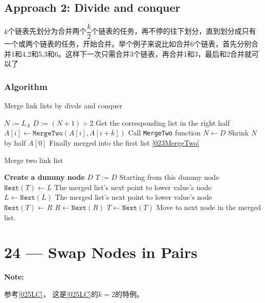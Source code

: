 \documentclass[a4paper,12pt]{article}
\begin{document}
\subsection{Approach 2: Divide and conquer}
\begin{CJK*}{UTF8}{gbsn}
$k$个链表先划分为合并两个$\dfrac{k}{2}$个链表的任务，再不停的往下划分，直到划分成只有一个或两个链表的任务，开始合并。举个例子来说比如合并6个链表，首先分别合并1和4,2和5,3和6。这样下一次只需合并3个链表，再合并1和3，最后和2合并就可以了
\clearpage
\end{CJK*}
\subsubsection{Algorithm}
\begin{algorithm}[H]
\caption{Merge link lists by divde and conquer}
\begin{algorithmic}[1]
\Statex
{}
\State $N:=L_{A}$
\State $D := (N+1) \div 2$ \Comment Get the corresponding list in the right half
\State $A[i] \gets \mathtt{MergeTwo}(A[i], A[i+k])$ \Comment Call \texttt{MergeTwo} function
\EndFor
\State $N\gets D$ \Comment Shrink $N$ by half
\EndWhile
\State \Return $A[0]$ \Comment Finally merged into the first list \ref{023MergeTwo}
\EndProcedure
\Statex
\end{algorithmic}
\end{algorithm}

\begin{algorithm}[H]
\caption{Merge two link list}
\label{023MergeTwo}
\begin{algorithmic}[1]
\Statex
{}
\State \textbf{Create a dummy node} $D$
\State $T := D$ \Comment Starting from this dummy node
\State $\mathtt{Next}(T) \gets L$ \Comment The merged list's next point to lower value's node
\State $L \gets \mathtt{Next}(L)$
\Else \Comment The merged list's next point to lower value's node
\State  $\mathtt{Next}(T) \gets R$ 
\State $R \gets \mathtt{Next}(R)$
\EndIf
\State $T \gets \mathtt{Next}(T)$ \Comment Move to next node in the merged list.
\EndWhile
\EndProcedure
\Statex
\end{algorithmic}
\end{algorithm}

\section{24 --- Swap Nodes in Pairs} 
\textbf{\large{Note:}}
\begin{CJK*}{UTF8}{gbsn}
参考\ref{025LC}， 这是\ref{025LC}的$k=2$的特例。
\clearpage
\end{CJK*}
\end{document}
